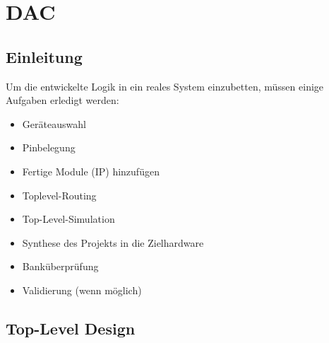 \documentclass[./\jobname.tex]{subfiles}
\begin{document}
%
\def\codeFolderName{DSM_DAC_toplevel_design_starting_point}
\def\codeFileName{}
\def\codeFolderNameB{}
%
\chapter{DAC}
%
\section{Einleitung}
%
Um die entwickelte Logik in ein reales System einzubetten, müssen einige Aufgaben erledigt werden:
%
\begin{itemize}
	\item Geräteauswahl
	\item Pinbelegung
	\item Fertige Module (IP) hinzufügen
	\item Toplevel-Routing
	\item Top-Level-Simulation
	\item Synthese des Projekts in die Zielhardware
	\item Banküberprüfung
	\item Validierung (wenn möglich)
\end{itemize}
%
\section{Top-Level Design}
%
%
\begin{figure}[H]
	\centering
	\noindent{}
	\label{fig: Simulink Implementierung}
\end{figure}
%
\begin{figure}[H]
	\centering
	\noindent{}
	\label{fig: toplevel.pdf}
\end{figure}
%
\end{document}

